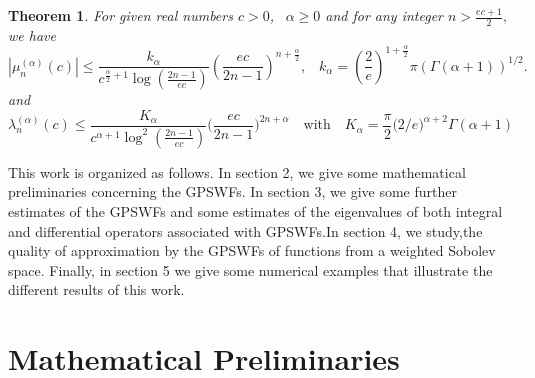 \documentclass[]{article}
\newtheorem{theorem}{Theorem}
\newcounter{rea}
\begin{document}
\begin{theorem}
	For given real numbers $c > 0$,$ \;\; \;\alpha\geq 0$ and for any integer $n > \frac{ec+1}{2},$ we have
	\begin{equation}\label{Eq3.1}
	| \mu_n^{(\alpha)}(c)| \leq  \frac{k_{\alpha}}{c^{\frac{\alpha}{2}+1}\log\left(\frac{2n-1}{ec}\right)}
	\left(\frac{ec}{2n-1}\right)^{n+\frac{\alpha}{2}},\;\;\; k_{\alpha}=\left(\frac{2}{e}\right)^{1+\frac{\alpha}{2}}\pi(\Gamma(\alpha+1))^{1/2}.
	\end{equation}
	and
	\begin{equation}\label{newdecay}
	\lambda_n^{(\alpha)}(c) \leq \frac{K_\alpha}{c^{\alpha+1}\log^2(\frac{2n-1}{ec})}\Big(\frac{ec}{2n-1}\Big)^{2n+\alpha} \quad \mbox{with} \quad K_{\alpha} = \frac{\pi}{2}\big(2/e \big)^{\alpha+2} \Gamma(\alpha+1)\nonumber
	\end{equation}
\end{theorem}
This work is organized as follows. In section 2,  we give some mathematical  preliminaries concerning the GPSWFs. In section 3, we give some further estimates of the GPSWFs and some estimates of the eigenvalues of both integral and differential operators associated with GPSWFs.In section 4, we study,the quality  of approximation by the GPSWFs of functions from a weighted Sobolev space. Finally, in section 5  we give some numerical examples that illustrate the different results of this work.
\section{Mathematical Preliminaries}
\end{document}
